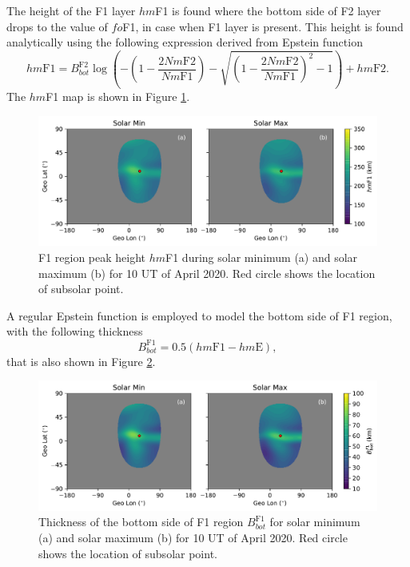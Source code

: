 \documentclass[draft]{agujournal2019}
\begin{document}
The height of the F1 layer $hm$F1 is found where the bottom side of F2 layer drops to the value of $fo$F1, in case when F1 layer is present. This height is found analytically using the following expression derived from Epstein function
\begin{equation}\label{eqn:hmF1}
hm\mathrm{F1}=B^{\mathrm{F2}}_{bot}\log\left(-\left(1-\frac{2Nm\mathrm{F2}}{Nm\mathrm{F1}}\right)-\sqrt{\left(1-\frac{2Nm\mathrm{F2}}{Nm\mathrm{F1}}\right)^2-1}\right)+hm\mathrm{F2}.
\end{equation}
The $hm$F1 map is shown in Figure \ref{fig:hmF1_min_max}.
\begin{figure}[H]
  \includegraphics[scale=0.7]{PyIRI_hmF1_min_max.pdf}
  \caption{F1 region peak height $hm$F1 during solar minimum (a) and solar maximum (b) for 10 UT of April 2020. Red circle shows the location of subsolar point.}
  \label{fig:hmF1_min_max}
\end{figure}

A regular Epstein function is employed to model the bottom side of F1 region, with the following thickness
\begin{equation}\label{eqn:foF1}
B^{\mathrm{F1}}_{bot}=0.5(hm\mathrm{F1}-hm\mathrm{E}),
\end{equation}
that is also shown in Figure \ref{fig:BF1_bot_min_max}.

\begin{figure}[H]
  \includegraphics[scale=0.7]{PyIRI_B_F1_bot_min_max.pdf}
  \caption{Thickness of the bottom side of F1 region $B^{\mathrm{F1}}_{bot}$ for solar minimum (a) and solar maximum (b) for 10 UT of April 2020. Red circle shows the location of subsolar point.}
  \label{fig:BF1_bot_min_max}
\end{figure}
\end{document}
